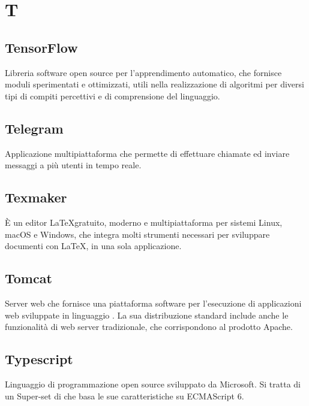 \section*{T}
\markright{}
\subsection*{TensorFlow}
Libreria software open source per l'apprendimento automatico, che fornisce moduli sperimentati e ottimizzati, utili nella realizzazione di algoritmi per diversi tipi di compiti percettivi e di comprensione del linguaggio.

\subsection*{Telegram}
Applicazione multipiattaforma che permette di effettuare chiamate ed inviare messaggi a più utenti in tempo reale.

\subsection*{Texmaker}
È un editor \LaTeX gratuito, moderno e multipiattaforma per sistemi Linux, macOS e Windows, che integra molti strumenti necessari per sviluppare documenti con \LaTeX, in una sola applicazione.

\subsection*{Tomcat}
Server web che fornisce una piattaforma software per l'esecuzione di applicazioni web sviluppate in linguaggio . La sua distribuzione standard include anche le funzionalità di web server tradizionale, che corrispondono al prodotto Apache. 

\subsection*{Typescript}
Linguaggio di programmazione open source sviluppato da Microsoft. Si tratta di un Super-set di  che basa le sue caratteristiche su ECMAScript 6.

